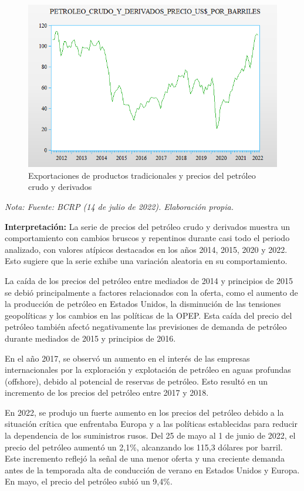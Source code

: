 \documentclass[
  letterpaper,
  DIV=11,
  numbers=noendperiod]{scrartcl}
\begin{document}
\begin{figure}

\caption{\label{fig-3}Exportaciones de productos tradicionales y precios
del petróleo crudo y derivados}

{\centering \includegraphics{20230603085638.png}

}

\end{figure}

\emph{Nota: Fuente: BCRP (14 de julio de 2022). Elaboración propia.}

\textbf{Interpretación:} La serie de precios del petróleo crudo y
derivados muestra un comportamiento con cambios bruscos y repentinos
durante casi todo el periodo analizado, con valores atípicos destacados
en los años 2014, 2015, 2020 y 2022. Esto sugiere que la serie exhibe
una variación aleatoria en su comportamiento.

La caída de los precios del petróleo entre mediados de 2014 y principios
de 2015 se debió principalmente a factores relacionados con la oferta,
como el aumento de la producción de petróleo en Estados Unidos, la
disminución de las tensiones geopolíticas y los cambios en las políticas
de la OPEP. Esta caída del precio del petróleo también afectó
negativamente las previsiones de demanda de petróleo durante mediados de
2015 y principios de 2016.

En el año 2017, se observó un aumento en el interés de las empresas
internacionales por la exploración y explotación de petróleo en aguas
profundas (offshore), debido al potencial de reservas de petróleo. Esto
resultó en un incremento de los precios del petróleo entre 2017 y 2018.

En 2022, se produjo un fuerte aumento en los precios del petróleo debido
a la situación crítica que enfrentaba Europa y a las políticas
establecidas para reducir la dependencia de los suministros rusos. Del
25 de mayo al 1 de junio de 2022, el precio del petróleo aumentó un
2,1\%, alcanzando los 115,3 dólares por barril. Este incremento reflejó
la señal de una menor oferta y una creciente demanda antes de la
temporada alta de conducción de verano en Estados Unidos y Europa. En
mayo, el precio del petróleo subió un 9,4\%.
\end{document}

